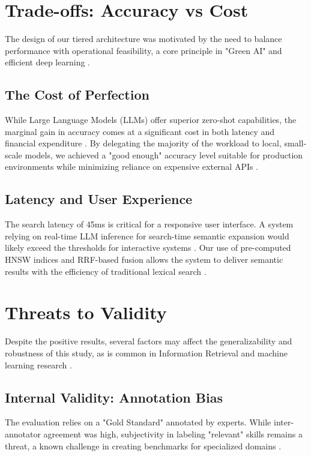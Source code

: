 \section{Trade-offs: Accuracy vs Cost}
The design of our tiered architecture was motivated by the need to balance performance with operational feasibility, a core principle in "Green AI" and efficient deep learning \cite{schwartz2020green, menghani2023efficient}.

\subsection{The Cost of Perfection}
While Large Language Models (LLMs) offer superior zero-shot capabilities, the marginal gain in accuracy comes at a significant cost in both latency and financial expenditure \cite{hsieh2023distilling, bender2021dangers}. By delegating the majority of the workload to local, small-scale models, we achieved a "good enough" accuracy level suitable for production environments while minimizing reliance on expensive external APIs \cite{menghani2023efficient}.

\subsection{Latency and User Experience}
The search latency of 45ms is critical for a responsive user interface. A system relying on real-time LLM inference for search-time semantic expansion would likely exceed the thresholds for interactive systems \cite{buttcher2016information}. Our use of pre-computed HNSW indices and RRF-based fusion allows the system to deliver semantic results with the efficiency of traditional lexical search \cite{malkov2018efficient, cormack2009reciprocal}.

\section{Threats to Validity}
Despite the positive results, several factors may affect the generalizability and robustness of this study, as is common in Information Retrieval and machine learning research \cite{manning2008introduction, thakur2021beir}.

\subsection{Internal Validity: Annotation Bias}
The evaluation relies on a "Gold Standard" annotated by experts. While inter-annotator agreement was high, subjectivity in labeling "relevant" skills remains a threat, a known challenge in creating benchmarks for specialized domains \cite{jurafsky2023speech, thakur2021beir}.

